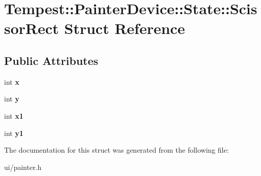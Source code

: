 \hypertarget{struct_tempest_1_1_painter_device_1_1_state_1_1_scissor_rect}{\section{Tempest\+:\+:Painter\+Device\+:\+:State\+:\+:Scissor\+Rect Struct Reference}
\label{struct_tempest_1_1_painter_device_1_1_state_1_1_scissor_rect}
}
\subsection*{Public Attributes}
\begin{DoxyCompactItemize}
\item 
\hypertarget{struct_tempest_1_1_painter_device_1_1_state_1_1_scissor_rect_acb77aba22e032cce7efcef193e218f14}{int {\bfseries x}}\label{struct_tempest_1_1_painter_device_1_1_state_1_1_scissor_rect_acb77aba22e032cce7efcef193e218f14}

\item 
\hypertarget{struct_tempest_1_1_painter_device_1_1_state_1_1_scissor_rect_acacab3eb348110dd683272f61265ea76}{int {\bfseries y}}\label{struct_tempest_1_1_painter_device_1_1_state_1_1_scissor_rect_acacab3eb348110dd683272f61265ea76}

\item 
\hypertarget{struct_tempest_1_1_painter_device_1_1_state_1_1_scissor_rect_ae9c156c304c1759588fdfa269357f13a}{int {\bfseries x1}}\label{struct_tempest_1_1_painter_device_1_1_state_1_1_scissor_rect_ae9c156c304c1759588fdfa269357f13a}

\item 
\hypertarget{struct_tempest_1_1_painter_device_1_1_state_1_1_scissor_rect_a28deb46c95d24559ba23b4de871c864c}{int {\bfseries y1}}\label{struct_tempest_1_1_painter_device_1_1_state_1_1_scissor_rect_a28deb46c95d24559ba23b4de871c864c}

\end{DoxyCompactItemize}


The documentation for this struct was generated from the following file\+:\begin{DoxyCompactItemize}
\item 
ui/painter.\+h\end{DoxyCompactItemize}
